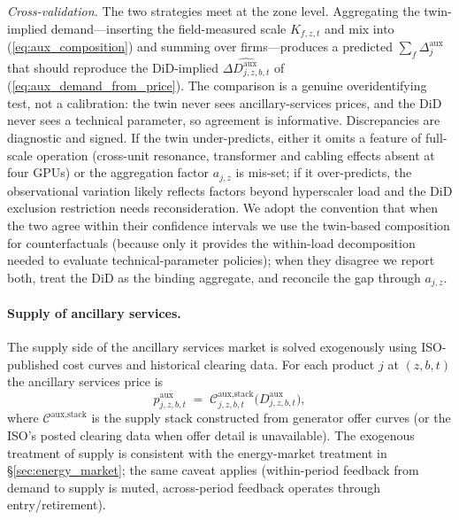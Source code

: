 \documentclass[12pt,letterpaper]{article}
\begin{document}
\emph{Cross-validation.} The two strategies meet at the zone level. Aggregating
the twin-implied demand---inserting the field-measured scale $K_{f,z,t}$ and
mix into (\ref{eq:aux_composition}) and summing over firms---produces a
predicted $\sum_f \Delta^{\text{aux}}_j$ that should reproduce the
DiD-implied $\widehat{\Delta D^{\text{aux}}_{j,z,b,t}}$ of
(\ref{eq:aux_demand_from_price}). The comparison is a genuine overidentifying
test, not a calibration: the twin never sees ancillary-services prices, and the
DiD never sees a technical parameter, so agreement is informative.
Discrepancies are diagnostic and signed. If the twin under-predicts, either it
omits a feature of full-scale operation (cross-unit resonance, transformer and
cabling effects absent at four GPUs) or the aggregation factor $a_{j,z}$ is
mis-set; if it over-predicts, the observational variation likely reflects
factors beyond hyperscaler load and the DiD exclusion restriction needs
reconsideration. We adopt the convention that when the two agree within their
confidence intervals we use the twin-based composition for counterfactuals
(because only it provides the within-load decomposition needed to evaluate
technical-parameter policies); when they disagree we report both, treat the DiD
as the binding aggregate, and reconcile the gap through $a_{j,z}$.

\paragraph{Supply of ancillary services.} The supply side of the ancillary
services market is solved exogenously using ISO-published cost curves and
historical clearing data. For each product $j$ at $(z,b,t)$ the ancillary
services price is
\begin{equation}
\label{eq:aux_price}
p^{\text{aux}}_{j,z,b,t} \;=\; \mathcal{C}^{\text{aux,stack}}_{j,z,b,t}\big(D^{\text{aux}}_{j,z,b,t}\big),
\end{equation}
where $\mathcal{C}^{\text{aux,stack}}$ is the supply stack constructed from
generator offer curves (or the ISO's posted clearing data when offer
detail is unavailable). The exogenous treatment of supply is consistent
with the energy-market treatment in \S\ref{sec:energy_market}; the same
caveat applies (within-period feedback from demand to supply is muted,
across-period feedback operates through entry/retirement).
\end{document}

